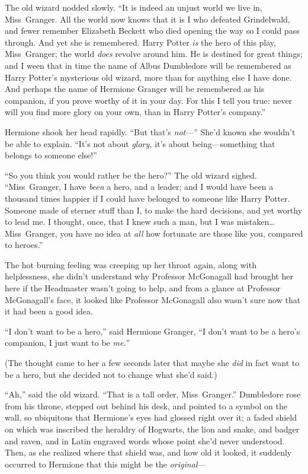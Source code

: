 The old wizard nodded slowly. “It is indeed an unjust world we live in, Miss~Granger. All the world now knows that it is I who defeated Grindelwald, and fewer remember Elizabeth Beckett who died opening the way so I could pass through. And yet she is remembered. Harry Potter \emph{is} the hero of this play, Miss~Granger; the world \emph{does} revolve around him. He is destined for great things; and I ween that in time the name of Albus Dumbledore will be remembered as Harry Potter’s mysterious old wizard, more than for anything else I have done. And perhaps the name of Hermione Granger will be remembered as his companion, if you prove worthy of it in your day. For this I tell you true: never will you find more glory on your own, than in Harry Potter’s company.”

Hermione shook her head rapidly. “But that’s \emph{not}—” She’d known she wouldn’t be able to explain. “It’s not about \emph{glory,} it’s about being—something that belongs to someone else!”

“So you think you would rather be the hero?” The old wizard sighed. “Miss~Granger, I have \emph{been} a hero, and a leader; and I would have been a thousand times happier if I could have belonged to someone like Harry Potter. Someone made of sterner stuff than I, to make the hard decisions, and yet worthy to lead me. I thought, once, that I knew such a man, but I was mistaken…Miss~Granger, you have no idea at \emph{all} how fortunate are those like you, compared to heroes.”

The hot burning feeling was creeping up her throat again, along with helplessness, she didn’t understand why Professor McGonagall had brought her here if the Headmaster wasn’t going to help, and from a glance at Professor McGonagall’s face, it looked like Professor McGonagall also wasn’t sure now that it had been a good idea.

“I don’t want to be a hero,” said Hermione Granger, “I don’t want to be a hero’s companion, I just want to be \emph{me.}”

(The thought came to her a few seconds later that maybe she \emph{did} in fact want to be a hero, but she decided not to change what she’d said.)

“Ah,” said the old wizard. “That is a tall order, Miss~Granger.” Dumbledore rose from his throne, stepped out behind his desk, and pointed to a symbol on the wall, so ubiquitous that Hermione’s eyes had glossed right over it; a faded shield on which was inscribed the heraldry of Hogwarts, the lion and snake, and badger and raven, and in Latin engraved words whose point she’d never understood. Then, as she realized where that shield was, and how old it looked, it suddenly occurred to Hermione that this might be the \emph{original}—

